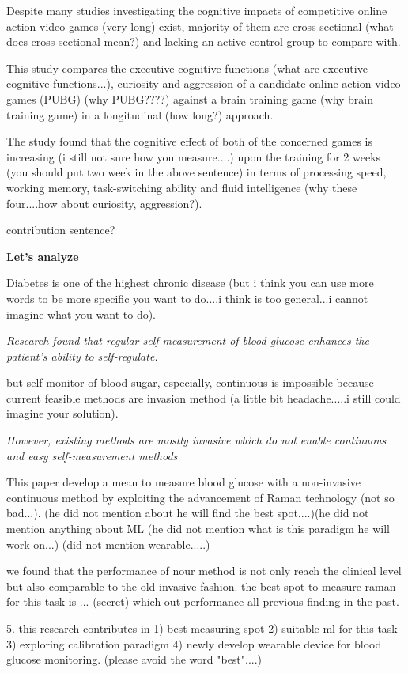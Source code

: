 Despite many studies investigating the cognitive impacts of competitive online action video games (very long) exist, majority of them are cross-sectional (what does cross-sectional mean?) and lacking an active control group to compare with. 

This study compares the executive cognitive functions (what are executive cognitive functions...), curiosity and aggression of a candidate online action video games (PUBG) (why PUBG????) against a brain training game (why brain training game) in a longitudinal (how long?) approach. 

The study found that the cognitive effect of both of the concerned games is increasing (i still not sure how you measure....) upon the training for 2 weeks (you should put two week in the above sentence) in terms of processing speed, working memory, task-switching ability and fluid intelligence (why these four....how about curiosity, aggression?).

contribution sentence?

\textbf{Let's analyze}

Diabetes is one of the highest chronic disease (but i think you can use more words to be more specific you want to do....i think is too general...i cannot imagine what you want to do).

\textit{Research found that regular self-measurement of blood glucose enhances the patient's ability to self-regulate.}

but self monitor of blood sugar, especially, continuous is impossible because current feasible methods are invasion method (a little bit headache.....i still could imagine your solution).

\textit{However, existing methods are mostly invasive which do not enable continuous and easy self-measurement methods}

This paper develop a mean to measure blood glucose with a non-invasive continuous method by exploiting the advancement of Raman technology (not so bad...).  (he did not mention about he will find the best spot....)(he did not mention anything about ML (he did not mention what is this paradigm he will work on...) (did not mention wearable.....)

we found that the performance of nour method is not only reach the clinical level but also comparable to the old invasive fashion. the best spot to measure raman for this task is ... (secret) which out performance all previous finding in the past.

5. this research contributes in 1) best measuring spot 2) suitable ml for this task 3) exploring calibration paradigm 4) newly develop wearable device for blood glucose monitoring. (please avoid the word "best"....)

